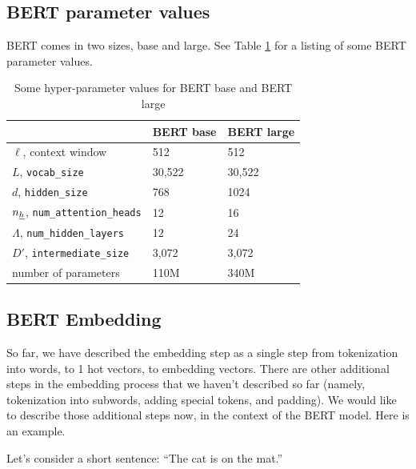 \subsection{BERT parameter values}

BERT comes in two sizes, base and large.
See Table \ref{tab-bert} for a listing
of some BERT parameter values.

\begin{table}[h!]
\centering
\begin{tabular}{|l|l|l|}
\hline
 & \cellcolor[HTML]{FFFFC7}BERT base & \cellcolor[HTML]{FFFFC7}BERT large \\ \hline
\cellcolor[HTML]{FFFFC7}$\ell$, context window& 512 & 512 \\ \hline
\cellcolor[HTML]{FFFFC7}$L$, {\tt vocab\_size} & 30,522 & 30,522 \\ \hline
\cellcolor[HTML]{FFFFC7}$d$, {\tt hidden\_size} & 768 & 1024 \\ \hline
\cellcolor[HTML]{FFFFC7}$n_{\underline{h}}$, {\tt num\_attention\_heads} & 12 & 16 \\ \hline
\cellcolor[HTML]{FFFFC7}$\Lambda$, {\tt num\_hidden\_layers} & 12 & 24 \\ \hline
\cellcolor[HTML]{FFFFC7}$D'$, {\tt intermediate\_size} & 3,072 & 3,072 \\ \hline
\cellcolor[HTML]{FFFFC7}number of parameters & 110M & 340M \\ \hline
\end{tabular}
\caption{Some hyper-parameter values for BERT base and BERT large}
\label{tab-bert}
\end{table}

\subsection{BERT Embedding}
So far, we have described the embedding step as a single step
from tokenization into words, to 1 hot vectors, to embedding vectors.
 There are
other additional steps in  the embedding
process that  we haven't
described so far (namely, tokenization
into subwords,
adding special tokens, and
padding). We would like to 
describe those additional steps now, in the context of
 the BERT model. Here is an example.


Let's consider a short sentence: \enquote{The cat is on the mat.}

